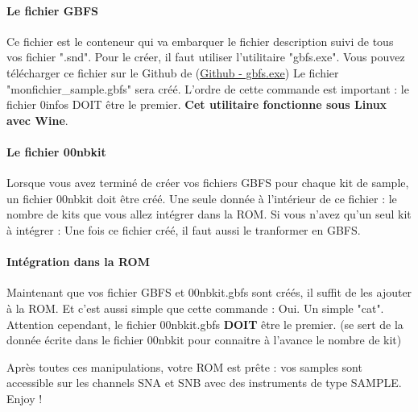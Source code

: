 \paragraph{Le fichier GBFS} Ce fichier est le conteneur qui va embarquer le fichier description suivi de tous vos fichier ".snd".
Pour le créer, il faut utiliser l'utilitaire "gbfs.exe".
Vous pouvez télécharger ce fichier sur le Github de \FAT (\href{https://github.com/cbrouillard/furiousadvancetracker/blob/master/gbfs.exe?raw=true}{Github - gbfs.exe})
Le fichier "monfichier\_sample.gbfs" sera créé.
L'ordre de cette commande est important : le fichier 0infos DOIT être le premier.
{\bf Cet utilitaire fonctionne sous Linux avec Wine}.

\paragraph{Le fichier 00nbkit} Lorsque vous avez terminé de créer vos fichiers GBFS pour chaque kit de sample, un fichier 00nbkit doit être créé.
Une seule donnée à l'intérieur de ce fichier : le nombre de kits que vous allez intégrer dans la ROM.
Si vous n'avez qu'un seul kit à intégrer :
Une fois ce fichier créé, il faut aussi le tranformer en GBFS.

\paragraph{Intégration dans la ROM} Maintenant que vos fichier GBFS et 00nbkit.gbfs sont créés, il suffit de les ajouter à la ROM.
Et c'est aussi simple que cette commande :
Oui. Un simple "cat".
Attention cependant, le fichier 00nbkit.gbfs {\bf DOIT} être le premier.
(\FAT se sert de la donnée écrite dans le fichier 00nbkit pour connaitre à l'avance le nombre de kit)
\medskip

Après toutes ces manipulations, votre ROM est prête : vos samples sont accessible sur les channels SNA et SNB avec des instruments de type SAMPLE. Enjoy !
